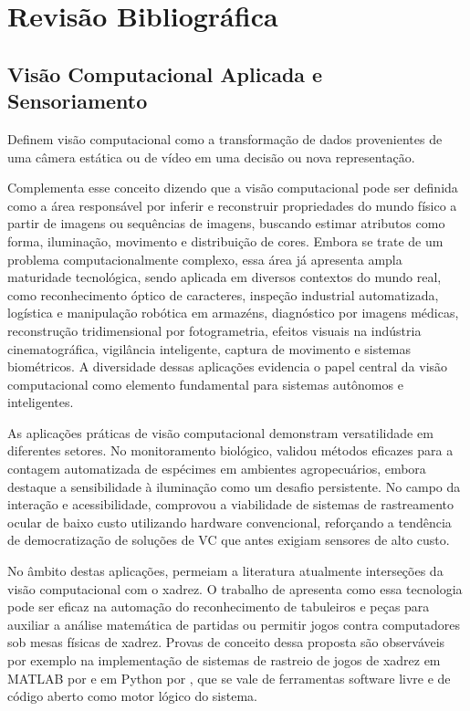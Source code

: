 \chapter*{Revisão Bibliográfica}

\section*{Visão Computacional Aplicada e Sensoriamento}

 Definem visão computacional como a transformação de dados provenientes de uma câmera estática ou de vídeo em uma decisão ou nova representação.

 Complementa esse conceito dizendo que a visão computacional pode ser definida como a área responsável por inferir e reconstruir propriedades do mundo físico a partir de imagens ou sequências de imagens, buscando estimar atributos como forma, iluminação, movimento e distribuição de cores. Embora se trate de um problema computacionalmente complexo, essa área já apresenta ampla maturidade tecnológica, sendo aplicada em diversos contextos do mundo real, como reconhecimento óptico de caracteres, inspeção industrial automatizada, logística e manipulação robótica em armazéns, diagnóstico por imagens médicas, reconstrução tridimensional por fotogrametria, efeitos visuais na indústria cinematográfica, vigilância inteligente, captura de movimento e sistemas biométricos. A diversidade dessas aplicações evidencia o papel central da visão computacional como elemento fundamental para sistemas autônomos e inteligentes.

As aplicações práticas de visão computacional demonstram versatilidade em diferentes setores. No monitoramento biológico,  validou métodos eficazes para a contagem automatizada de espécimes em ambientes agropecuários, embora destaque a sensibilidade à iluminação como um desafio persistente. No campo da interação e acessibilidade,  comprovou a viabilidade de sistemas de rastreamento ocular de baixo custo utilizando hardware convencional, reforçando a tendência de democratização de soluções de VC que antes exigiam sensores de alto custo.

No âmbito destas aplicações, permeiam a literatura atualmente interseções da visão computacional com o xadrez. O trabalho de  apresenta como essa tecnologia pode ser eficaz na automação do reconhecimento de tabuleiros e peças para auxiliar a análise matemática de partidas ou permitir jogos contra computadores sob mesas físicas de xadrez. Provas de conceito dessa proposta são observáveis por exemplo na implementação de sistemas de rastreio de jogos de xadrez em MATLAB por  e em Python por , que se vale de ferramentas software livre e de código aberto como motor lógico do sistema.

